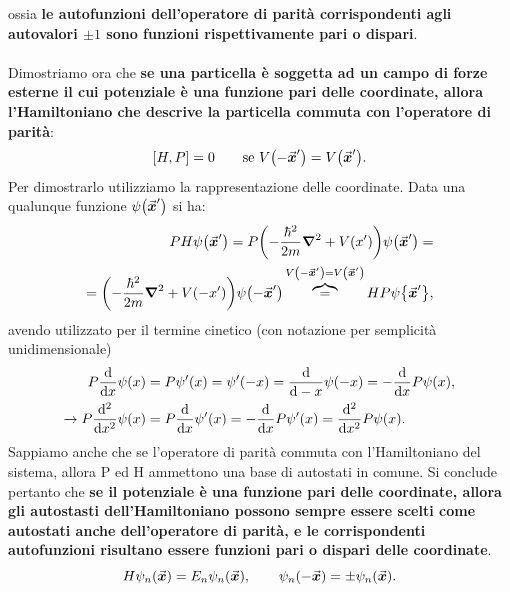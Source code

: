 \documentclass[a4paper,12pt,oneside]{book}
\begin{document}
ossia \textbf{le autofunzioni dell'operatore di parità corrispondenti agli autovalori $\pm1$ sono funzioni rispettivamente pari o dispari}.\\
\\
Dimostriamo ora che \textbf{se una particella è soggetta ad un campo di forze esterne il cui potenziale è una funzione pari delle coordinate, allora l'Hamiltoniano che descrive la particella commuta con l'operatore di parità}:
\begin{equation}
  \comm{H}{P} = 0 \qquad \text{se } V\qty(-\va*{x}')= V\qty(\va*{x}') .
\end{equation}
Per dimostrarlo utilizziamo la rappresentazione delle coordinate. Data una qualunque funzione $\psi\qty(\va*{x}')$ si ha:
\begin{align}
  PH\psi\qty(\va*{x}') = P\qty(-\frac{\hbar^2}{2m}\grad^2+V\qty(x'))\psi\qty(\va*{x}') =\nonumber\\
  =\qty(-\frac{\hbar^2}{2m}\grad^2+V\qty(-x'))\psi\qty(-\va*{x}') \overbrace{=}^{ V\qty(-\va*{x}')=V\qty(\va*{x}')} HP\psi\qty{\va*{x}'}  ,
\end{align}
avendo utilizzato per il termine cinetico (con notazione per semplicità unidimensionale)
\begin{align}
  P\dv{x}\psi(x)&=P\psi'(x)= \psi'(-x)=\dv{-x}\psi(-x)=-\dv{x}P\psi(x),\\
  \to P\dv[2]{x}\psi(x)&= P\dv{x}\psi'(x) = -\dv{x}P\psi'(x)= \dv[2]{x}P\psi(x) .
\end{align}
Sappiamo anche che se l'operatore di parità commuta con l'Hamiltoniano del sistema, allora P ed H ammettono una base di autostati in comune. Si conclude pertanto che \textbf{se il potenziale è una funzione pari delle coordinate, allora gli autostasti dell'Hamiltoniano possono sempre essere scelti come autostati anche dell'operatore di parità, e le corrispondenti autofunzioni risultano essere funzioni pari o dispari delle coordinate}.
\begin{equation}
  H\psi_n\qty(\va*{x})=E_n\psi_n\qty(\va*{x}), \qquad \psi_n\qty(-\va*{x})=\pm\psi_n\qty(\va*{x}) .
\end{equation}
\end{document}
